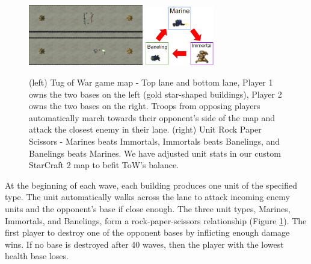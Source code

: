 \documentclass{article}
\begin{document}

\begin{figure}[htp]
    \centering
    \includegraphics[width=5cm]{img/intro/gameMapRaw.PNG} \includegraphics[width=3cm]{img/intro/rockPaperScissors.PNG}

    \caption{(left) Tug of War game map - Top lane and bottom lane, Player 1 owns the two bases on the left (gold star-shaped buildings), Player 2 owns the two bases on the right. Troops from opposing players automatically march towards their opponent's side of the map and attack the closest enemy in their lane. (right) Unit Rock Paper Scissors - Marines beats Immortals, Immortals beats Banelings, and Banelings beats Marines. We have adjusted unit stats in our custom StarCraft 2 map to befit ToW's balance.}
    \label{fig:ToW-ScreenShot}
\end{figure}

At the beginning of each wave, each building produces one unit of the specified type. The unit automatically walks across the lane to attack incoming enemy units and the opponent's base if close enough. The three unit types, Marines, Immortals, and Banelings, form a rock-paper-scissors relationship (Figure \ref{fig:ToW-ScreenShot}). The first player to destroy one of the opponent bases by inflicting enough damage wins. If no base is destroyed after 40 waves, then the player with the lowest health base loses. 
\end{document}

